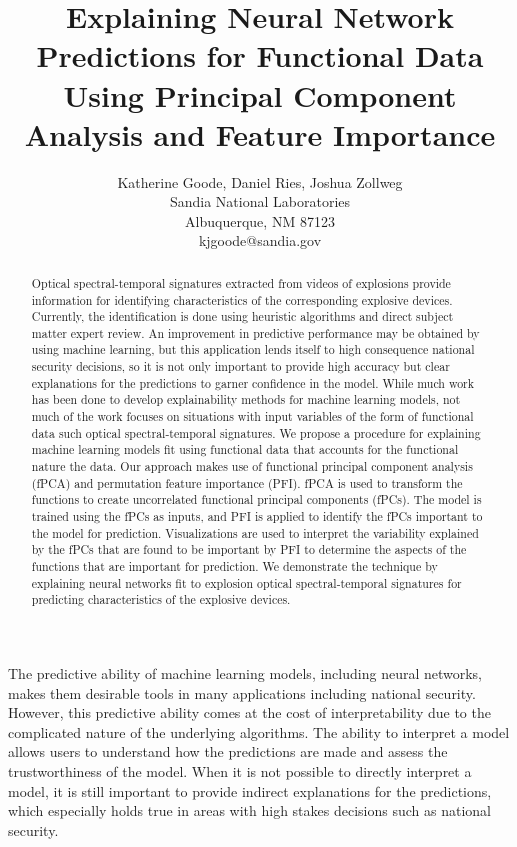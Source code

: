 \documentclass[letterpaper]{article}
\title{Explaining Neural Network Predictions for Functional Data Using Principal Component Analysis and Feature Importance}
\author{Katherine Goode, Daniel Ries, Joshua Zollweg\\ Sandia National Laboratories\\ Albuquerque, NM 87123\\ kjgoode@sandia.gov}
\begin{document}
\maketitle

\begin{abstract}
Optical spectral-temporal signatures extracted from videos of explosions provide information for identifying characteristics of the corresponding explosive devices. Currently, the identification is done using heuristic algorithms and direct subject matter expert review. An improvement in predictive performance may be obtained by using machine learning, but this application lends itself to high consequence national security decisions, so it is not only important to provide high accuracy but clear explanations for the predictions to garner confidence in the model. While much work has been done to develop explainability methods for machine learning models, not much of the work focuses on situations with input variables of the form of functional data such optical spectral-temporal signatures. We propose a procedure for explaining machine learning models fit using functional data that accounts for the functional nature the data. Our approach makes use of functional principal component analysis (fPCA) and permutation feature importance (PFI). fPCA is used to transform the functions to create uncorrelated functional principal components (fPCs). The model is trained using the fPCs as inputs, and PFI is applied to identify the fPCs important to the model for prediction. Visualizations are used to interpret the variability explained by the fPCs that are found to be important by PFI to determine the aspects of the functions that are important for prediction. We demonstrate the technique by explaining neural networks fit to explosion optical spectral-temporal signatures for predicting characteristics of the explosive devices.
\end{abstract}

\noindent The predictive ability of machine learning models, including neural networks, makes them desirable tools in many applications including national security. However, this predictive ability comes at the cost of interpretability due to the complicated nature of the underlying algorithms. The ability to interpret a model allows users to understand how the predictions are made and assess the trustworthiness of the model. When it is not possible to directly interpret a model, it is still important to provide indirect explanations for the predictions, which especially holds true in areas with high stakes decisions such as national security.
\end{document}
